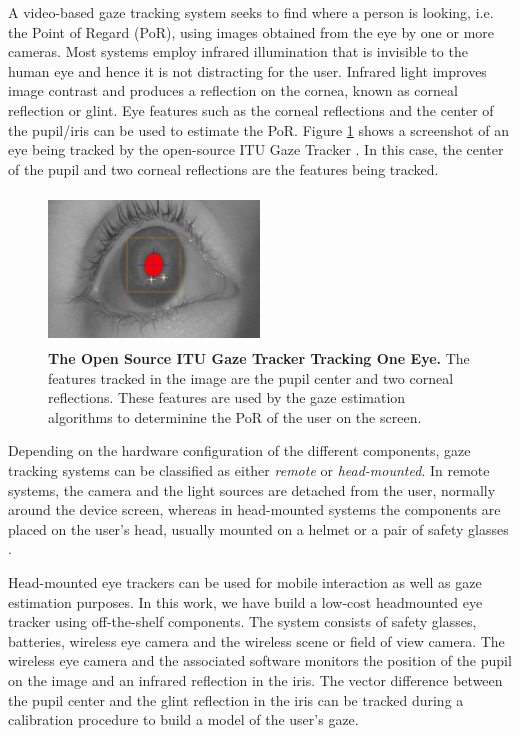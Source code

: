 \documentclass[10pt,a4paper]{article}
\begin{document}
A video-based gaze tracking system seeks to find where a person is looking, i.e. the Point of Regard (PoR), using images
obtained from the eye by one or more cameras. Most systems employ infrared illumination that is invisible to the human
eye and hence it is not distracting for the user. Infrared light improves image contrast and produces a reflection on
the cornea, known as corneal reflection or glint. Eye features such as the corneal reflections and the center of the
pupil/iris can be used to estimate the PoR. Figure \ref{screenGazeTracker} shows a screenshot of an eye being tracked by
the open-source ITU Gaze Tracker \cite{lowcostitugazetracker,Rozado2012}. In this case, the center of the pupil and two
corneal reflections are the features being tracked.


\begin{figure}[ht]
\begin{center}
\includegraphics[width=0.5\textwidth, height=40mm]{figures/screenGazeTracker.jpg}
\vspace{-3mm}
\end{center}
\caption{\textbf{The Open Source ITU Gaze Tracker Tracking One Eye.} The
features tracked in the image are the pupil center and two corneal reflections. These features are used by the gaze 
estimation algorithms to determinine the PoR of the user on the screen.}
\label{screenGazeTracker}
\end{figure}

Depending on the hardware configuration of the different components, gaze tracking systems can be classified as either
\textit{remote} or \textit{head-mounted}. In remote systems, the camera and the light sources are detached from the
user, normally around the device screen, whereas in head-mounted systems the components are placed on the user's head, usually
mounted on a helmet or a pair of safety glasses \cite{lowcostitugazetracker}.

Head-mounted eye trackers can be used for mobile interaction as well as gaze estimation purposes.
In this work, we have build a low-cost headmounted eye tracker using off-the-shelf components.  The system consists of
safety glasses, batteries, wireless eye camera and the wireless scene or field of view camera. The wireless eye camera
and the associated software monitors the position of the pupil on the image and an infrared reflection in the iris. The
vector difference between the pupil center and the glint reflection in the iris can be tracked during a calibration
procedure to build a model of the user's gaze.
\end{document}

